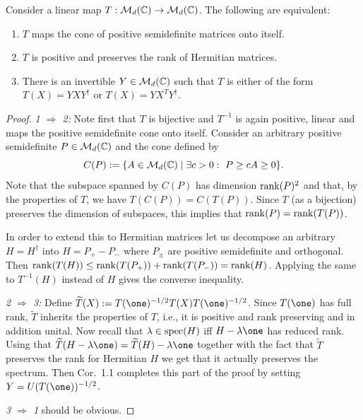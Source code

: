 \documentclass[11pt,a4paper]{article}
\numberwithin{equation}{section}
\begin{document}
\begin{proposition}
    Consider a linear map $T:\mathcal{M}_d(\mathbb{C})\to \mathcal{M}_d(\mathbb{C})$. The following are equivalent:
    \begin{enumerate}
        \item $T$ maps the cone of positive semidefinite matrices onto itself.
        \item $T$ is positive and preserves the rank of Hermitian matrices.
        \item There is an invertible $Y\in \mathcal{M}_d(\mathbb{C})$ such that $T$ is either of the form
              $T(X)=YXY^\dagger$ or $T(X)=Y X^T Y^\dagger$.
    \end{enumerate}
\end{proposition}

\begin{proof}
    \textit{1 $\Rightarrow$ 2:} Note first that $T$ is bijective and $T^{-1}$ is again positive, linear and
    maps the positive semidefinite cone onto itself. Consider an arbitrary positive semidefinite $P\in \mathcal{M}_d(\mathbb{C})$ and
    the cone defined by
    \begin{equation}\label{eq:ch3:3.42}
        C(P):=\{A\in \mathcal{M}_d(\mathbb{C})\mid \exists c>0:\ P\ge cA\ge 0\}.
    \end{equation}
    Note that the subspace spanned by $C(P)$ has dimension $\operatorname{rank}(P)^2$ and that, by the properties of $T$, we have
    $T(C(P))=C(T(P))$. Since $T$ (as a bijection) preserves the dimension of subspaces, this implies that
    $\operatorname{rank}(P)=\operatorname{rank}(T(P))$.

    In order to extend this to Hermitian matrices let us decompose an arbitrary $H=H^\dagger$ into $H=P_+-P_-$ where $P_\pm$
    are positive semidefinite and orthogonal. Then
    $\operatorname{rank}(T(H))\le \operatorname{rank}(T(P_+))+\operatorname{rank}(T(P_-))=\operatorname{rank}(H)$. Applying the same to $T^{-1}(H)$ instead of $H$ gives the converse
    inequality.

    \textit{2 $\Rightarrow$ 3:} Define $\widetilde T(X):=T(\one)^{-1/2}T(X)T(\one)^{-1/2}$. Since $T(\one)$ has full rank,
    $\widetilde T$ inherits the properties of $T$, i.e., it is positive and rank preserving and in addition unital. Now
    recall that $\lambda\in \operatorname{spec}(H)$ iff $H-\lambda\one$ has reduced rank. Using that
    $\widetilde T(H-\lambda\one)=\widetilde T(H)-\lambda\one$ together with the fact that $\widetilde T$ preserves the rank
    for Hermitian $H$ we get that it actually preserves the spectrum. Then Cor.~1.1 completes this part of the proof by
    setting $Y=U(T(\one))^{-1/2}$.

    \textit{3 $\Rightarrow$ 1} should be obvious.
\end{proof}
\end{document}
